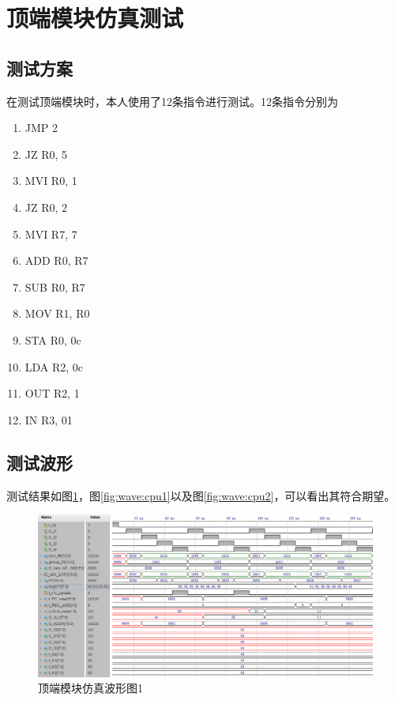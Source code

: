 \documentclass[forprint]{WHUBachelor}
\begin{document}
\section{顶端模块仿真测试}

\subsection{测试方案}

在测试顶端模块时，本人使用了12条指令进行测试。12条指令分别为

\begin{enumerate}[1.]
\item JMP 2
\item JZ R0, 5
\item MVI R0, 1
\item JZ R0, 2
\item MVI R7, 7
\item ADD R0, R7
\item SUB R0, R7
\item MOV R1, R0
\item STA R0, 0c
\item LDA R2, 0c
\item OUT R2, 1
\item IN R3, 01
\end{enumerate}

\subsection{测试波形}

测试结果如图\ref{fig:wave:cpu0}，图\ref{fig:wave:cpu1}以及图\ref{fig:wave:cpu2}，可以看出其符合期望。

\begin{figure}[H]
  \centering
  \includegraphics[width=7in]{figures/waveforms/cpu0.png}
  \caption{顶端模块仿真波形图1}
  \label{fig:wave:cpu0}
\end{figure}
\end{document}
